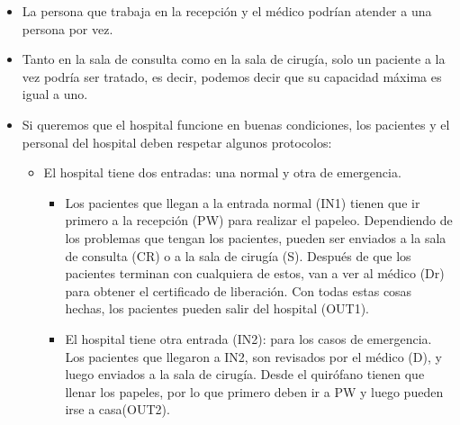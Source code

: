 \begin{itemize}
    \item La persona que trabaja en la recepción y el médico podrían atender a una persona por vez.
    \item Tanto en la sala de consulta como en la sala de cirugía, solo un paciente a la vez podría ser tratado, es decir, podemos decir que su capacidad máxima es igual a uno.
    \item Si queremos que el hospital funcione en buenas condiciones, los pacientes y el personal del hospital deben respetar algunos protocolos:
        \begin{itemize}
            \item El hospital tiene dos entradas: una normal y otra de emergencia.
                \begin{itemize}
                    \item Los pacientes que llegan a la entrada normal (IN1) tienen que ir primero a la recepción (PW) para realizar el papeleo. Dependiendo de los problemas que tengan los pacientes, pueden ser enviados a la sala de consulta (CR) o a la sala de cirugía (S). Después de que los pacientes terminan con cualquiera de estos, van a ver al médico (Dr) para obtener el certificado de liberación. Con todas estas cosas hechas, los pacientes pueden salir del hospital (OUT1).
                    \item El hospital tiene otra entrada (IN2): para los casos de emergencia. Los pacientes que llegaron a IN2, son revisados por el médico (D), y luego enviados a la sala de cirugía. Desde el quirófano tienen que llenar los papeles, por lo que primero deben ir a PW y luego pueden irse a casa(OUT2). 
                    \bigskip
                    

\end{itemize}
\end{itemize}
\end{itemize}
